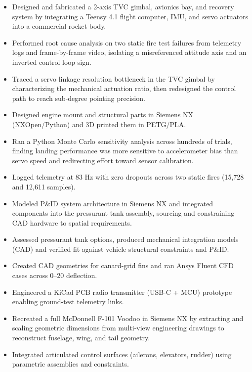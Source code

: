 \begin{itemize}
  \item Designed and fabricated a 2-axis TVC gimbal, avionics bay, and recovery system by integrating a Teensy 4.1 flight computer, IMU, and servo actuators into a commercial rocket body.
  \item Performed root cause analysis on two static fire test failures from telemetry logs and frame-by-frame video, isolating a misreferenced attitude axis and an inverted control loop sign.
  \item Traced a servo linkage resolution bottleneck in the TVC gimbal by characterizing the mechanical actuation ratio, then redesigned the control path to reach sub-degree pointing precision.
  \item Designed engine mount and structural parts in Siemens NX (NXOpen/Python) and 3D printed them in PETG/PLA.
  \item Ran a Python Monte Carlo sensitivity analysis across hundreds of trials, finding landing performance was more sensitive to accelerometer bias than servo speed and redirecting effort toward sensor calibration.
  \item Logged telemetry at 83 Hz with zero dropouts across two static fires (15,728 and 12,611 samples).
\end{itemize}
\entrygap

\begin{itemize}
  \item Modeled P\&ID system architecture in Siemens NX and integrated components into the pressurant tank assembly, sourcing and constraining CAD hardware to spatial requirements.
  \item Assessed pressurant tank options, produced mechanical integration models (CAD) and verified fit against vehicle structural constraints and P\&ID.
  \item Created CAD geometries for canard-grid fins and ran Ansys Fluent CFD cases across 0--20\textdegree{} deflection.
  \item Engineered a KiCad PCB radio transmitter (USB-C + MCU) prototype enabling ground-test telemetry links.
\end{itemize}
\entrygap

\begin{itemize}
  \item Recreated a full McDonnell F-101 Voodoo in Siemens NX by extracting and scaling geometric dimensions from multi-view engineering drawings to reconstruct fuselage, wing, and tail geometry.
  \item Integrated articulated control surfaces (ailerons, elevators, rudder) using parametric assemblies and constraints.
\end{itemize}
\entrygap


